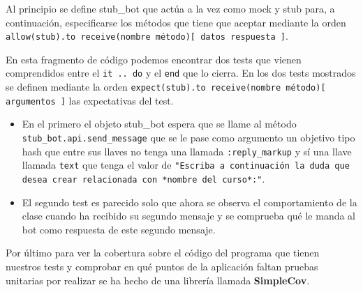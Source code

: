 Al principio se define stub\_bot que actúa a la vez como mock y stub para, a continuación, especificarse los métodos que tiene que aceptar mediante la orden \texttt{allow(stub).to receive(nombre método)[ datos respuesta ]}.
\par
En esta fragmento de código podemos encontrar dos tests que vienen comprendidos entre el \texttt{it .. do} y el \texttt{end} que lo cierra. En los dos tests mostrados  se definen mediante la orden \texttt{expect(stub).to receive(nombre método)[  argumentos ]} las expectativas del test.
\begin{itemize}
 \item En el primero el objeto stub\_bot espera que se llame al método 
 \texttt{stub\_bot.api.send\_message} que se le pase como argumento un objetivo tipo hash que entre sus llaves no tenga una llamada \texttt{:reply\_markup} y sí una llave llamada \texttt{text} que tenga el valor de \texttt{"Escriba a continuación la duda que desea crear relacionada con *nombre del curso*:"}. 
 \item El segundo test es parecido solo que ahora se observa el comportamiento de la clase cuando ha recibido su segundo mensaje y se comprueba qué le manda al bot como respuesta de este segundo mensaje.
 \end{itemize}
 \par
 
 Por último para ver la cobertura sobre el código del programa que tienen nuestros tests y comprobar en qué puntos de la aplicación faltan pruebas unitarias por realizar se ha hecho de una librería llamada \textbf{SimpleCov}.
